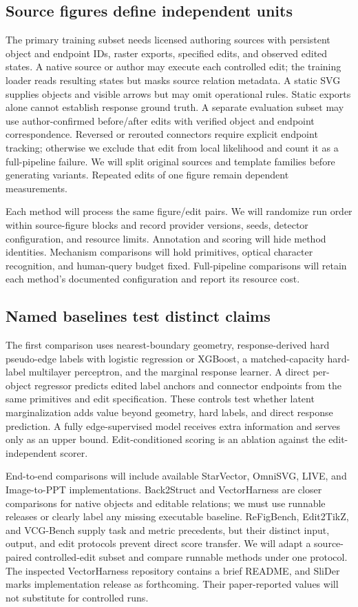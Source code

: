 \documentclass{article}
\begin{document}
\subsection{Source figures define independent units}
The primary training subset needs licensed authoring sources with persistent object and endpoint IDs, raster exports, specified edits, and observed edited states. A native source or author may execute each controlled edit; the training loader reads resulting states but masks source relation metadata. A static SVG supplies objects and visible arrows but may omit operational rules. Static exports alone cannot establish response ground truth. A separate evaluation subset may use author-confirmed before/after edits with verified object and endpoint correspondence. Reversed or rerouted connectors require explicit endpoint tracking; otherwise we exclude that edit from local likelihood and count it as a full-pipeline failure. We will split original sources and template families before generating variants. Repeated edits of one figure remain dependent measurements.

Each method will process the same figure/edit pairs. We will randomize run order within source-figure blocks and record provider versions, seeds, detector configuration, and resource limits. Annotation and scoring will hide method identities. Mechanism comparisons will hold primitives, optical character recognition, and human-query budget fixed. Full-pipeline comparisons will retain each method's documented configuration and report its resource cost.

\subsection{Named baselines test distinct claims}
The first comparison uses nearest-boundary geometry, response-derived hard pseudo-edge labels with logistic regression or XGBoost, a matched-capacity hard-label multilayer perceptron, and the marginal response learner. A direct per-object regressor predicts edited label anchors and connector endpoints from the same primitives and edit specification. These controls test whether latent marginalization adds value beyond geometry, hard labels, and direct response prediction. A fully edge-supervised model receives extra information and serves only as an upper bound. Edit-conditioned scoring is an ablation against the edit-independent scorer.

End-to-end comparisons will include available StarVector, OmniSVG, LIVE, and Image-to-PPT \citep{sun2026imageppt} implementations. Back2Struct and VectorHarness are closer comparisons for native objects and editable relations; we must use runnable releases or clearly label any missing executable baseline. ReFigBench, Edit2TikZ, and VCG-Bench supply task and metric precedents, but their distinct input, output, and edit protocols prevent direct score transfer. We will adapt a source-paired controlled-edit subset and compare runnable methods under one protocol. The inspected VectorHarness repository contains a brief README, and SliDer marks implementation release as forthcoming. Their paper-reported values will not substitute for controlled runs.
\end{document}
